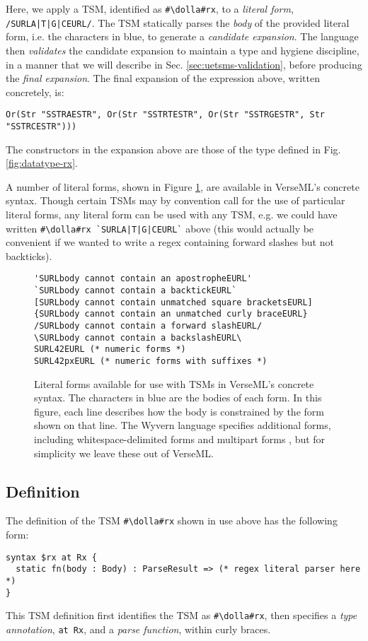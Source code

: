 Here, we apply a {TSM}, identified as \lstinline{#\dolla#rx}, 
to a \emph{literal form}, \lstinline{/SURLA|T|G|CEURL/}. 
The TSM statically parses the \emph{body} of the provided literal form, i.e. the characters in blue, to generate a \emph{candidate expansion}. The language then \emph{validates} the candidate expansion to maintain a type and hygiene discipline, in a manner that we will describe in Sec. \ref{sec:uetsms-validation}, before producing the \emph{final expansion}. The final expansion of the expression above, written concretely, is:
\begin{lstlisting}[numbers=none]
Or(Str "SSTRAESTR", Or(Str "SSTRTESTR", Or(Str "SSTRGESTR", Str "SSTRCESTR")))
\end{lstlisting}
The constructors in the expansion above are those of the type  defined in Fig. \ref{fig:datatype-rx}.

A number of literal forms, shown in Figure \ref{fig:literal-forms},  are available in VerseML's concrete syntax. Though certain TSMs may by convention call for the use of particular literal forms, any literal form can be used with any TSM, e.g. we could have written \lstinline{#\dolla#rx `SURLA|T|G|CEURL`} above (this would actually be convenient if we wanted to write a regex containing forward slashes but not backticks). %

\begin{figure}
\begin{lstlisting}
'SURLbody cannot contain an apostropheEURL'
`SURLbody cannot contain a backtickEURL`
[SURLbody cannot contain unmatched square bracketsEURL]
{SURLbody cannot contain an unmatched curly braceEURL}
/SURLbody cannot contain a forward slashEURL/
\SURLbody cannot contain a backslashEURL\
SURL42EURL (* numeric forms *)
SURL42pxEURL (* numeric forms with suffixes *)
\end{lstlisting}
\caption[Available Literal Forms]{Literal forms available for use with TSMs in VerseML's concrete syntax. The characters in blue are the bodies of each form. In this figure, each line describes how the body is constrained by the form shown on that line. The Wyvern language specifies additional forms, including whitespace-delimited forms \cite{TSLs} and multipart forms \cite{sac15}, but for simplicity we leave these out of VerseML.}
\label{fig:literal-forms}
\end{figure}
\subsection{Definition}\label{sec:uetsms-definition}
The definition of the TSM \lstinline{#\dolla#rx} shown in use above has the following form:
\begin{lstlisting}[numbers=none,mathescape=|]
syntax $rx at Rx {
  static fn(body : Body) : ParseResult => (* regex literal parser here *)
}
\end{lstlisting}
This {TSM definition} first identifies the TSM as \lstinline{#\dolla#rx}, then specifies a \emph{type annotation}, \lstinline{at Rx}, and a \emph{parse function}, within curly braces. 

